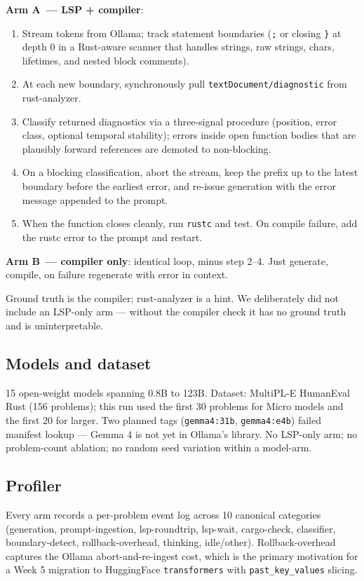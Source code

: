 \documentclass[11pt]{article}
\newcommand{\armA}{\textbf{Arm A}}
\newcommand{\armB}{\textbf{Arm B}}
\begin{document}
\textbf{\armA\ --- LSP + compiler}:
\begin{enumerate}
    \item Stream tokens from Ollama; track statement boundaries (\texttt{;} or closing \texttt{\}} at depth 0 in a Rust-aware scanner that handles strings, raw strings, chars, lifetimes, and nested block comments).
    \item At each new boundary, synchronously pull \texttt{textDocument/diagnostic} from rust-analyzer.
    \item Classify returned diagnostics via a three-signal procedure (position, error class, optional temporal stability); errors inside open function bodies that are plausibly forward references are demoted to non-blocking.
    \item On a blocking classification, abort the stream, keep the prefix up to the latest boundary before the earliest error, and re-issue generation with the error message appended to the prompt.
    \item When the function closes cleanly, run \texttt{rustc} and test. On compile failure, add the rustc error to the prompt and restart.
\end{enumerate}

\textbf{\armB\ --- compiler only}: identical loop, minus step 2--4. Just generate, compile, on failure regenerate with error in context.

Ground truth is the compiler; rust-analyzer is a hint. We deliberately did not include an LSP-only arm --- without the compiler check it has no ground truth and is uninterpretable.

\subsection{Models and dataset}

15 open-weight models spanning 0.8B to 123B. Dataset: MultiPL-E HumanEval Rust (156 problems); this run used the first 30 problems for Micro models and the first 20 for larger. Two planned tags (\texttt{gemma4:31b}, \texttt{gemma4:e4b}) failed manifest lookup --- Gemma 4 is not yet in Ollama's library. No LSP-only arm; no problem-count ablation; no random seed variation within a model-arm.

\subsection{Profiler}

Every arm records a per-problem event log across 10 canonical categories (generation, prompt-ingestion, lsp-roundtrip, lsp-wait, cargo-check, classifier, boundary-detect, rollback-overhead, thinking, idle/other). Rollback-overhead captures the Ollama abort-and-re-ingest cost, which is the primary motivation for a Week 5 migration to HuggingFace \texttt{transformers} with \texttt{past\_key\_values} slicing.
\end{document}
